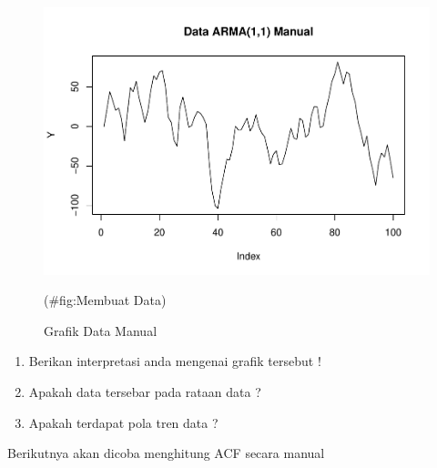 \documentclass[
]{book}
\begin{document}
\begin{figure}

{\centering \includegraphics{_main_files/figure-latex/Membuat Data-1} 

}

\caption{Grafik Data Manual}(\#fig:Membuat Data)
\end{figure}
\begin{jp}{}{}
\begin{enumerate}
\item Berikan interpretasi anda mengenai grafik tersebut !  
\item Apakah data tersebar pada rataan data ?  
\item Apakah terdapat pola tren data ?
\end{enumerate}
\end{jp}

Berikutnya akan dicoba menghitung ACF secara manual
\end{document}
